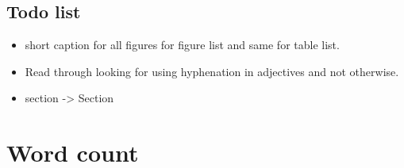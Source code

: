 \documentclass[a4paper,10pt,twoside]{memoir}
\begin{document}


\section*{Todo list}
\begin{itemize}
    \item short caption for all figures for figure list and same for table list.
    \item Read through looking for using hyphenation in adjectives and not otherwise.
    \item section -> Section

\end{itemize}



\setcounter{chapter}{1}


\setcounter{chapter}{2}


\setcounter{chapter}{3}


% 

% 

\setcounter{chapter}{5}





\chapter*{Word count}
\immediate{}

\end{document}
